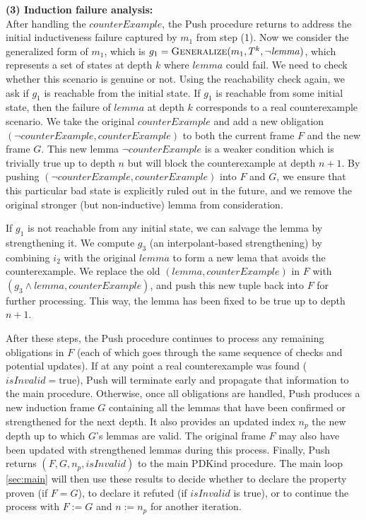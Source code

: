 \textbf{(3) Induction failure analysis:} \\
After handling the $\mathit{counterExample}$, the Push procedure returns to address the initial
inductiveness failure captured by $m_1$ from step (1). Now we consider
the generalized form of $m_1$, which is $g_1 = \textsc{Generalize}(m_1, T^k,
\neg \mathit{lemma})$, which represents a set of states at depth $k$ where
$\mathit{lemma}$ could fail. We need to check whether this scenario is genuine
or not. Using the reachability check again, we ask if $g_1$ is reachable from
the initial state. If $g_1$ is reachable from some initial state, then the failure of $\mathit{lemma}$ at
depth $k$ corresponds to a real counterexample scenario. We take the original
$\mathit{counterExample}$ and add a new obligation $(\neg \mathit{counterExample}, \mathit{counterExample})$ to both
the current frame $F$ and the new frame $G$. This new lemma $\neg
\mathit{counterExample}$ is a weaker condition which is trivially true up to depth $n$ but will
block the counterexample at depth $n+1$. By pushing $(\neg
\mathit{counterExample}, \mathit{counterExample})$ into $F$ and $G$, we ensure
that this particular bad state is explicitly ruled out in the future, and we
remove the original stronger (but non-inductive) lemma from consideration.

If $g_1$ is not reachable from any initial state, we can
salvage the lemma by strengthening it. We compute $g_3$ (an
interpolant-based strengthening) by combining $i_2$ with the
original $\mathit{lemma}$ to form a new lema that avoids the counterexample. We replace the old
$(\mathit{lemma}, \mathit{counterExample})$ in $F$ with $(g_3 \land
\mathit{lemma}, \mathit{counterExample})$, and push this new tuple back into
$F$ for further processing. This way, the lemma has been fixed to be true up
to depth $n+1$.

After these steps, the Push procedure continues to process any remaining
obligations in $F$ (each of which goes through the same sequence of checks and
potential updates). If at any point a real counterexample was found
($\mathit{isInvalid} = \text{true}$), Push will terminate early and propagate
that information to the main procedure. Otherwise, once all obligations are
handled, Push produces a new induction frame $G$ containing all the lemmas that
have been confirmed or strengthened for the next depth. It also provides an
updated index $n_p$ the new depth up to which $G$’s lemmas are valid. The
original frame $F$ may also have been updated with strengthened lemmas during
this process. Finally, Push returns $(F, G, n_p, \mathit{isInvalid})$ to the
main PDKind procedure. The main loop \ref{sec:main} will then use these
results to decide whether to declare the property proven (if $F = G$), to
declare it refuted (if $\mathit{isInvalid}$ is true), or to continue the
process with $F := G$ and $n := n_p$ for another iteration.

